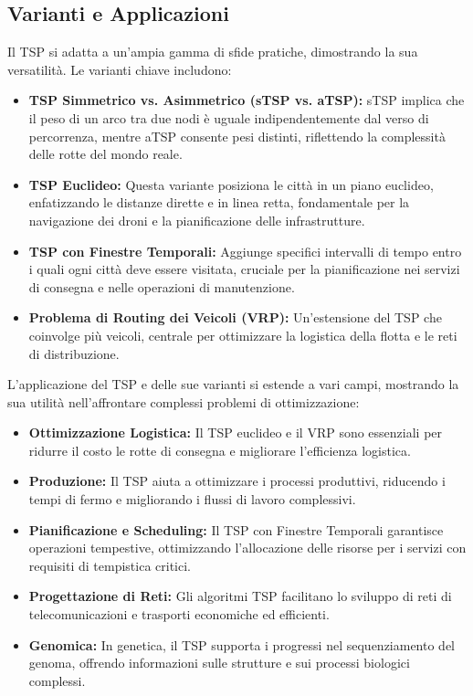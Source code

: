 \subsection{Varianti e Applicazioni}

Il \Gls{TSP} si adatta a un'ampia gamma di sfide pratiche, dimostrando la sua versatilità. Le varianti chiave includono:

\begin{itemize}
	\item \textbf{TSP Simmetrico vs. Asimmetrico (sTSP vs. aTSP):} sTSP implica che il peso di un arco tra due nodi è uguale indipendentemente dal verso di percorrenza, mentre aTSP consente pesi distinti, riflettendo la complessità delle rotte del mondo reale.
	\item \textbf{TSP Euclideo:} Questa variante posiziona le città in un piano euclideo, enfatizzando le distanze dirette e in linea retta, fondamentale per la navigazione dei droni e la pianificazione delle infrastrutture.
	\item \textbf{TSP con Finestre Temporali:} Aggiunge specifici intervalli di tempo entro i quali ogni città deve essere visitata, cruciale per la pianificazione nei servizi di consegna e nelle operazioni di manutenzione.
	\item \textbf{Problema di Routing dei Veicoli (VRP):} Un'estensione del \Gls{TSP} che coinvolge più veicoli, centrale per ottimizzare la logistica della flotta e le reti di distribuzione.
\end{itemize}

L'applicazione del \Gls{TSP} e delle sue varianti si estende a vari campi, mostrando la sua utilità nell'affrontare complessi problemi di ottimizzazione:

\begin{itemize}
	\item \textbf{Ottimizzazione Logistica:} Il \Gls{TSP} euclideo e il VRP sono essenziali per ridurre il costo  le rotte di consegna e migliorare l'efficienza logistica.
	\item \textbf{Produzione:} Il \Gls{TSP} aiuta a ottimizzare i processi produttivi, riducendo i tempi di fermo e migliorando i flussi di lavoro complessivi.
	\item \textbf{Pianificazione e Scheduling:} Il \Gls{TSP} con Finestre Temporali garantisce operazioni tempestive, ottimizzando l'allocazione delle risorse per i servizi con requisiti di tempistica critici.
	\item \textbf{Progettazione di Reti:} Gli algoritmi \Gls{TSP} facilitano lo sviluppo di reti di telecomunicazioni e trasporti economiche ed efficienti.
	\item \textbf{Genomica:} In genetica, il \Gls{TSP} supporta i progressi nel sequenziamento del genoma, offrendo informazioni sulle strutture e sui processi biologici complessi.
\end{itemize}

